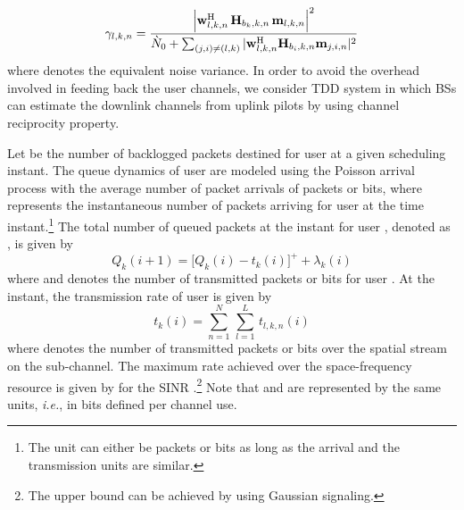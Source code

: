 \begin{equation}\label{eq:SINR}
\gamma_{l,k,n} = \dfrac{\left |\mvec{w}{l,k,n}^\herm \, \mvec{H}{b_k,k,n} \, \mvec{m}{l,k,n} \right |^2}{\enoise + \sum_{(j,i) \neq (l,k)} |\mvec{w}{l,k,n}^\herm \mvec{H}{b_i,k,n} \mvec{m}{j,i,n} |^2}
\end{equation}
where  denotes the equivalent noise variance. In order to avoid the overhead involved in feeding back the user channels, we consider \ac{TDD} system in which \acp{BS} can estimate the downlink channels from uplink pilots by using channel reciprocity property.

Let  be the number of backlogged packets destined for user  at a given scheduling instant. The queue dynamics of user  are modeled using the Poisson arrival process with the average number of packet arrivals of  packets or bits, where  represents the instantaneous number of packets arriving for user  at the  time instant.\footnote{The unit can either be packets or bits as long as the arrival and the transmission units are similar.} The total number of queued packets at the  instant for user , denoted as , is given by
\begin{equation}
Q_k(i+1) = \Big [ Q_k(i) - t_k(i) \Big ]^+ + \lambda_k(i)
\label{eqn-2a}
\end{equation}
where  and  denotes the number of transmitted packets or bits for user . At the  instant, the transmission rate of user  is given by
\begin{equation}
t_k(i) = \sum_{n = 1}^N \, \sum_{l = 1}^L \, t_{l,k,n}(i)
\end{equation}
where  denotes the number of transmitted packets or bits over the  spatial stream on the  sub-channel. The maximum rate achieved over the space-frequency resource  is given by  for the \ac{SINR} .\footnote{The upper bound can be achieved by using Gaussian signaling.} Note that  and  are represented by the same units, \textit{i.e.}, in bits defined per channel use. 